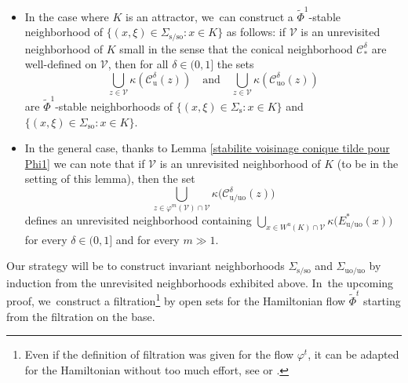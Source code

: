 \documentclass[11pt]{article}
\newcommand{\rs}{\mathrm{s}}
\newcommand{\rso}{\mathrm{so}}
\newcommand{\ru}{\mathrm{u}}
\newcommand{\ruo}{\mathrm{uo}}
\theoremstyle{definition}
\theoremstyle{plain}
\newcommand{\Ccal}{\mathcal{C}}
\newcommand{\Vcal}{\mathcal{V}}
\begin{document}
\begin{itemize}
\item In the case where $K$ is an attractor, we~can construct a $\widetilde{\Phi}^1$-stable neighborhood of $\{(x,\xi)\in\Sigma_{\rs/\rso}: x\in K\}$ as follows: if $\Vcal$ is an unrevisited neighborhood of $K$ small in the sense that the conical neighborhood $\Ccal_*^{\delta}$ are well-defined on $\Vcal$, then for all $\delta\in(0,1]$ the sets
\[
\bigcup_{z \in \Vcal} \kappa \left(\Ccal_{\ru}^{\delta}(z) \right) \quad \text{and} \quad \bigcup_{z \in \Vcal} \kappa \left(\Ccal_{\ruo}^{\delta}(z) \right)
\]
are $\widetilde{\Phi}^1$-stable neighborhoods of $\{(x,\xi)\in\Sigma_{\rs}: x\in K\}$ and $\{(x,\xi)\in\Sigma_{\rso}: x\in K\}$.
\item In the general case, thanks to Lemma \ref{stabilite voisinage conique tilde pour Phi1} we can note that if $\Vcal$ is an unrevisited neighborhood of $K$ (to be in the setting of this lemma), then the set
\[
\bigcup_{z \in \varphi^m (\Vcal)\cap \Vcal} \kappa \bigl(\Ccal_{\ru/\ruo}^{\delta}(z) \bigr)
\]
defines an unrevisited neighborhood containing $\bigcup_{x \in W^\ru (K) \cap \Vcal } \kappa\bigl(E_{\ru/\ruo}^* (x) \bigr)$ for every $\delta\in(0,1]$ and for every $m \gg 1$.
\end{itemize}

Our strategy will be to construct invariant neighborhoods $\Sigma_{\rs/\rso}$ and $\Sigma_{\ruo/\ruo}$ by induction from the unrevisited neighborhoods exhibited above. In~the upcoming proof, we~construct a filtration\footnote{Even if the definition of filtration was given for the flow $\varphi^t$, it can be adapted for the Hamiltonian without too much effort, see \cite{shub} or \cite{smale}.} by open sets for the Hamiltonian flow $\widetilde{\Phi}^t$ starting from the filtration on the base.
\end{document}
